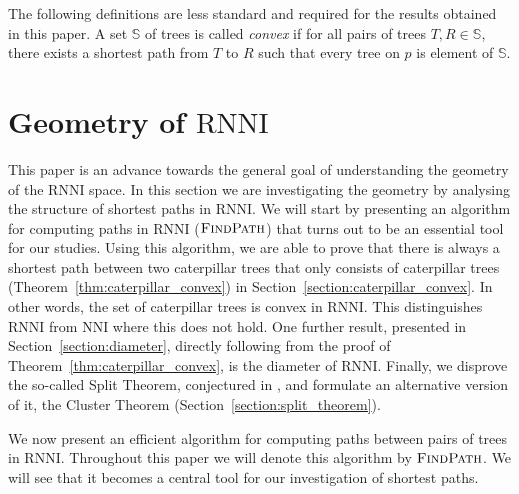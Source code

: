 \documentclass{amsart}
\newcommand{\nni}{\mathrm{NNI}}
\newcommand{\rnni}{\mathrm{RNNI}}
\newcommand{\findpath}{\textsc{FindPath}}
\begin{document}

The following definitions are less standard and required for the results obtained in this paper.
A set $\mathbb S$ of trees is called \emph{convex} if for all pairs of trees $T,R \in \mathbb S$, there exists a shortest path from $T$ to $R$ such that every tree on $p$ is element of $\mathbb S$.

\section{Geometry of $\rnni$}
\label{section:geometry}

This paper is an advance towards the general goal of understanding the geometry of the $\rnni$ space.
In this section we are investigating the geometry by analysing the structure of shortest paths in $\rnni$.
We will start by presenting an algorithm for computing paths in $\rnni$ ($\findpath$) that turns out to be an essential tool for our studies.
Using this algorithm, we are able to prove that there is always a shortest path between two caterpillar trees that only consists of caterpillar trees (Theorem~\ref{thm:caterpillar_convex}) in Section~\ref{section:caterpillar_convex}.
In other words, the set of caterpillar trees is convex in $\rnni$.
This distinguishes $\rnni$ from $\nni$ where this does not hold.
One further result, presented in Section~\ref{section:diameter}, directly following from the proof of Theorem~\ref{thm:caterpillar_convex}, is the diameter of $\rnni$.
Finally, we disprove the so-called Split Theorem, conjectured in \autocite{Gavryushkin2018-ol}, and formulate an alternative version of it, the Cluster Theorem (Section~\ref{section:split_theorem}).

We now present an efficient algorithm for computing paths between pairs of trees in $\rnni$.
Throughout this paper we will denote this algorithm by $\findpath$.
We will see that it becomes a central tool for our investigation of shortest paths.
\end{document}
